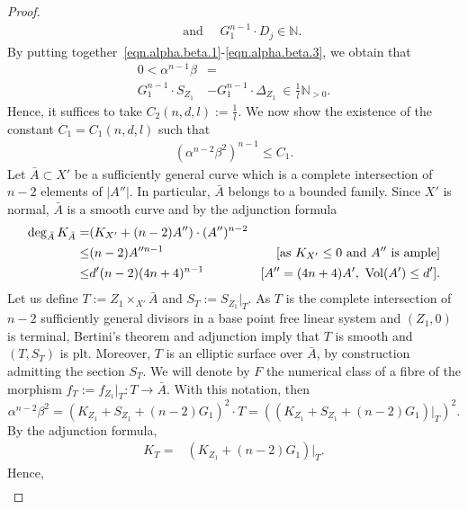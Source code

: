 \documentclass[11pt]{ip-journal}
\theoremstyle{definition}
\begin{document}
\begin{proof}
\begin{align}
\quad
\text{ and } 
\quad
G_1^{n-1} \cdot D_j \in \mathbb{N}.
\end{align}
By putting together~\eqref{eqn.alpha.beta.1}-\eqref{eqn.alpha.beta.3}, we obtain that 
\begin{align}
\label{eqn.alpha.beta.4}
\nonumber
0< \alpha^{n-1} \beta &= \\
G_1^{n-1} \cdot S_{Z_1} &- G_1^{n-1} \cdot \Delta_{Z_1} \ \in \frac 1 l \mathbb{N}_{>0}.
\end{align}
Hence, it suffices to take 
$C_2(n, d, l):=\frac 1 l$.
\newline
We now show the existence of the constant $C_1=C_1(n, d ,l)$ such that 
\begin{align*}
(\alpha^{n-2} \beta^2)^{n-1} \leq C_1.
\end{align*}
Let $\bar{A} \subset X'$ be a sufficiently general curve which is a complete intersection of $n-2$ elements of $|A''|$.
In particular, $\bar{A}$ belongs to a bounded family.
\newline
Since $X'$ is normal, $\bar{A}$ is a smooth curve and by the adjunction formula
\begin{align}
\nonumber
\deg_{\bar{A}} K_{\bar{A}} = & (K_{X'} + (n-2) A'') \cdot (A'')^{n-2} & \\
\label{adj.eqn1}
\leq & (n-2)A''^{n-1} & [\text{as } K_{X'} \leq  0 \text{ and } A'' \text{ is ample}]\\ 
\nonumber
\leq & d'(n-2) (4n+4)^{n-1} & [A''=(4n+4)A', \  {\rm Vol}(A')\leq d'].
\end{align}
Let us define $T := Z_1 \times_{X'} \bar{A}$ and $S_T := S_{Z_{1}}|_{T}$.
As $T$ is the complete intersection of $n-2$ sufficiently general divisors in a base point free linear system and $(Z_1, 0)$ is terminal, Bertini's theorem and adjunction imply that $T$ is smooth and $(T, S_T)$ is plt.
Moreover, $T$ is an elliptic surface over $\bar A$, by construction admitting the section $S_T$.
We will denote by $F$ the numerical class of a fibre of the morphism $f_T:= f_{Z_1}\vert_T \colon T \to \bar{A}$.
With this notation, then
\begin{equation}
\label{alpha.beta.eqn1}
\alpha^{n-2} \beta^2 = (K_{Z_1}+S_{Z_1}+(n-2)G_1)^2 \cdot T = ((K_{Z_1}+S_{Z_1}+(n-2)G_1)|_T)^2.
\end{equation}
By the adjunction formula, 
\begin{align}
\label{eqn.adj.formula.T}
 K_T=& (K_{Z_1}+(n-2)G_1)|_T.
\end{align}
Hence,
\begin{align}
\nonumber

\end{align}
\end{proof}
\end{document}
